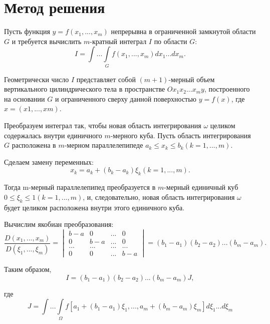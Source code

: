 \documentclass{report}
\begin{document}
\section*{Метод решения}
Пусть функция $y = f(x_{1}, ..., x_{m})$ непрерывна в ограниченной замкнутой области $G$ и требуется вычислить $m$-кратный интеграл $I$ по области $G$:
\begin{equation}I={\int...\int\limits_G} {f(x_{1}, ..., x_{m})dx_{1}...dx_{m}}.\end{equation}
\par Геометрически число $I$ представляет собой $(m + 1)$-мерный объем вертикального цилиндрического тела в пространстве $Ox_{1}x_{2} . . . x_{m}y$, построенного на основании $G$ и ограниченного сверху данной поверхностью $y = f(x)$,
где $x = (x1, . . . , xm)$.
\par Преобразуем интеграл так, чтобы новая область интегрирования $\omega$ целиком содержалась внутри единичного $m$-мерного куба. Пусть область интегрирования $G$ расположена в $m$-мерном параллелепипеде $a_{k} \leq x_{k} \leq b_{k}
(k = 1, . . . , m)$.
\par Сделаем замену переменных:
\begin{equation}x_{k} = a_{k} + (b_{k} - a_{k})\xi_{k} (k = 1, . . . , m).\end{equation}
\par Тогда m-мерный параллелепипед преобразуется в $m$-мерный единичный куб $0 \leq \xi_k \leq 1(k = 1, . . . , m)$, и, следовательно, новая область интегрирования $\omega$ будет целиком расположена внутри этого единичного куба.
\par Вычислим якобиан преобразования:
\begin{equation}\frac{D(x_{1}, ..., x_{m})}{D(\xi_{1}, ..., \xi_{m})} = 
\begin{vmatrix} 
b-a & 0 & ...& 0\\
0 & b-a & ... & 0\\
... & ... & ... & ...\\
0 & 0 & ... & b - a
\end{vmatrix}
= (b_{1} - a_{1})(b_{2} - a_{2}). . .(b_{m} - a_{m}).
\end{equation}
\par Таким образом,
\begin{equation}I = (b_{1} - a_{1})(b_{2} - a_{2}). . .(b_{m} - a_{m})J,\end{equation}
\par где
\begin{equation}J = {\int...\int\limits_\Omega}f[a_{1} + (b_{1} - a_{1})\xi_{1}, ... , a_{m} + (b_{m} - a_{m})\xi_m]d\xi_{1} ... d\xi_{m}\end{equation}
\end{document}
